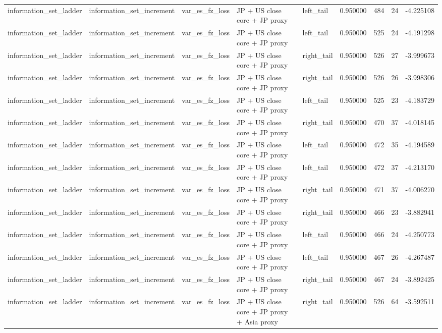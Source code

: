 \begin{tabular}{lllllrrrr}
information\_set\_ladder & information\_set\_increment & var\_es\_fz\_loss & JP + US close core + JP proxy & left\_tail & 0.950000 & 484 & 24 & -4.225108 \\
information\_set\_ladder & information\_set\_increment & var\_es\_fz\_loss & JP + US close core + JP proxy & left\_tail & 0.950000 & 525 & 24 & -4.191298 \\
information\_set\_ladder & information\_set\_increment & var\_es\_fz\_loss & JP + US close core + JP proxy & right\_tail & 0.950000 & 526 & 27 & -3.999673 \\
information\_set\_ladder & information\_set\_increment & var\_es\_fz\_loss & JP + US close core + JP proxy & right\_tail & 0.950000 & 526 & 26 & -3.998306 \\
information\_set\_ladder & information\_set\_increment & var\_es\_fz\_loss & JP + US close core + JP proxy & left\_tail & 0.950000 & 525 & 23 & -4.183729 \\
information\_set\_ladder & information\_set\_increment & var\_es\_fz\_loss & JP + US close core + JP proxy & right\_tail & 0.950000 & 470 & 37 & -4.018145 \\
information\_set\_ladder & information\_set\_increment & var\_es\_fz\_loss & JP + US close core + JP proxy & left\_tail & 0.950000 & 472 & 35 & -4.194589 \\
information\_set\_ladder & information\_set\_increment & var\_es\_fz\_loss & JP + US close core + JP proxy & left\_tail & 0.950000 & 472 & 37 & -4.213170 \\
information\_set\_ladder & information\_set\_increment & var\_es\_fz\_loss & JP + US close core + JP proxy & right\_tail & 0.950000 & 471 & 37 & -4.006270 \\
information\_set\_ladder & information\_set\_increment & var\_es\_fz\_loss & JP + US close core + JP proxy & right\_tail & 0.950000 & 466 & 23 & -3.882941 \\
information\_set\_ladder & information\_set\_increment & var\_es\_fz\_loss & JP + US close core + JP proxy & left\_tail & 0.950000 & 466 & 24 & -4.250773 \\
information\_set\_ladder & information\_set\_increment & var\_es\_fz\_loss & JP + US close core + JP proxy & left\_tail & 0.950000 & 467 & 26 & -4.267487 \\
information\_set\_ladder & information\_set\_increment & var\_es\_fz\_loss & JP + US close core + JP proxy & right\_tail & 0.950000 & 467 & 24 & -3.892425 \\
information\_set\_ladder & information\_set\_increment & var\_es\_fz\_loss & JP + US close core + JP proxy + Asia proxy & right\_tail & 0.950000 & 526 & 64 & -3.592511 \\

\end{tabular}

